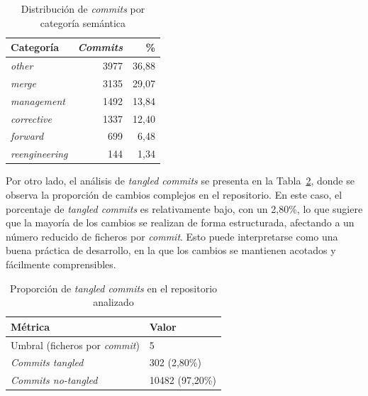 \documentclass[a4paper, 12pt]{book}
\begin{document}
\begin{table}[H]
\centering
\small
\begin{tabular}{|p{4.5cm}|r|r|}
\hline
\textbf{Categoría} & \textbf{\emph{Commits}} & \textbf{\%} \\
\hline

\emph{other} & 3977 & 36,88 \\
\hline

\emph{merge} & 3135 & 29,07 \\
\hline

\emph{management} & 1492 & 13,84 \\
\hline

\emph{corrective} & 1337 & 12,40 \\
\hline

\emph{forward} & 699 & 6,48 \\
\hline

\emph{reengineering} & 144 & 1,34 \\
\hline

\end{tabular}
\caption{Distribución de \emph{commits} por categoría semántica}
\label{tab:clasificacion}
\end{table}

Por otro lado, el análisis de \emph{tangled commits} se presenta en la Tabla~\ref{tab:tangled}, donde se observa la proporción de cambios complejos en el repositorio. En este caso, el porcentaje de \emph{tangled commits} es relativamente bajo, con un 2,80\%, lo que sugiere que la mayoría de los cambios se realizan de forma estructurada, afectando a un número reducido de ficheros por \emph{commit}. Esto puede interpretarse como una buena práctica de desarrollo, en la que los cambios se mantienen acotados y fácilmente comprensibles.

\begin{table}[H]
\centering
\small
\begin{tabular}{|p{6cm}|p{4cm}|}
\hline
\textbf{Métrica} & \textbf{Valor} \\
\hline

Umbral (ficheros por \emph{commit}) & 5 \\
\hline

\emph{Commits tangled} & 302 (2,80\%) \\
\hline

\emph{Commits no-tangled} & 10482 (97,20\%) \\
\hline

\end{tabular}
\caption{Proporción de \emph{tangled commits} en el repositorio analizado}
\label{tab:tangled}
\end{table}
\end{document}
